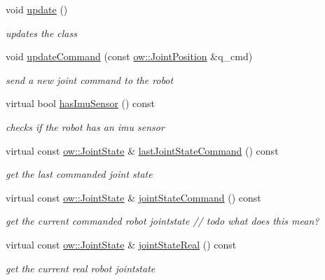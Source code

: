 \begin{DoxyCompactItemize}
\item 
void \hyperlink{classow__hw__interface_1_1Robot_aa35830037810623e3380c46a316e632f}{update} ()
\begin{DoxyCompactList}\small\item\em updates the class \end{DoxyCompactList}\item 
void \hyperlink{classow__hw__interface_1_1Robot_a0471617f2cb4ed3f63ddced805bb64fd}{update\+Command} (const \hyperlink{classow__core_1_1JointPosition}{ow\+::\+Joint\+Position} \&q\+\_\+cmd)
\begin{DoxyCompactList}\small\item\em send a new joint command to the robot \end{DoxyCompactList}\item 
virtual bool \hyperlink{classow__hw__interface_1_1Robot_a283e615df51ec2a1f63790034e3902b5}{has\+Imu\+Sensor} () const 
\begin{DoxyCompactList}\small\item\em checks if the robot has an imu sensor \end{DoxyCompactList}\item 
virtual const \hyperlink{classow__core_1_1JointState}{ow\+::\+Joint\+State} \& \hyperlink{classow__hw__interface_1_1Robot_a4905c6124e8601a2b535a53df7f4aaba}{last\+Joint\+State\+Command} () const 
\begin{DoxyCompactList}\small\item\em get the last commanded joint state \end{DoxyCompactList}\item 
virtual const \hyperlink{classow__core_1_1JointState}{ow\+::\+Joint\+State} \& \hyperlink{classow__hw__interface_1_1Robot_a0eae4e5911a90c8dedc678ddabd5998a}{joint\+State\+Command} () const 
\begin{DoxyCompactList}\small\item\em get the current commanded robot jointstate // todo what does this mean? \end{DoxyCompactList}\item 
virtual const \hyperlink{classow__core_1_1JointState}{ow\+::\+Joint\+State} \& \hyperlink{classow__hw__interface_1_1Robot_a5d8efc31c4939d4e3b84539412a5e595}{joint\+State\+Real} () const 
\begin{DoxyCompactList}\small\item\em get the current real robot jointstate \end{DoxyCompactList}\item 

\end{DoxyCompactItemize}
